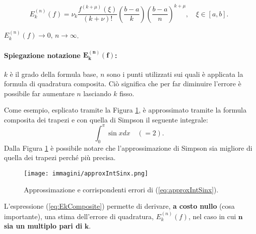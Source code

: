 \begin{definition}
	\begin{equation}\label{eq:EkComposite}
 E_k^{(n)}(f)=\nu_k\frac{f^{(k+\mu)}(\xi)}{(k+\nu)!}\left(\frac{b-a}{k}\right)\left(\frac{b-a}{n}\right)^{k+\mu}, \quad \xi\in[a,b].
\end{equation}
\end{definition}

\begin{remark}
	$E_k^{(n)}(f)\rightarrow 0,\, n\rightarrow\infty$.
\end{remark}

\paragraph{Spiegazione notazione $\boldsymbol{E_k^{(n)}(f)}$:} $k$ è il grado della formula base, $n$ sono i punti utilizzati sui quali è applicata la formula di quadratura composita. Ciò significa che per far diminuire l'errore è possibile far aumentare $n$ lasciando $k$ fisso.

\begin{example}
    Come esempio, esplicato tramite la Figura \ref{fig:approxIntSinx}, è approssimato tramite la formula composita dei trapezi e con quella di Simpson il seguente integrale:
    \begin{equation}\label{eq:approxIntSinx}
        \int_0^\pi \sin{x}dx\quad (=2).
    \end{equation}
    Dalla Figura \ref{fig:approxIntSinx} è possibile notare che l'approssimazione di Simpson sia migliore di quella dei trapezi perché più precisa.
\end{example}

\begin{figure}
    \centering
    \texttt{[image: immagini/approxIntSinx.png]}
    \caption{Approssimazione e corrispondenti errori di (\ref{eq:approxIntSinx}).}\label{fig:approxIntSinx}
\end{figure}

L'espressione (\ref{eq:EkComposite}) permette di derivare, \textbf{a costo nullo} (cosa importante), una stima dell'errore di quadratura, $E_k^{(n)}(f)$, nel caso in cui $\boldsymbol n$ \textbf{sia un multiplo pari di} $\boldsymbol k$.

